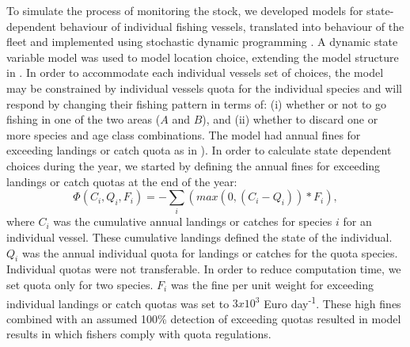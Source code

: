 \documentclass[12pt,oneline,a4paper,numbib]{ouparticle}
\numberwithin{equation}{subsection} %
\begin{document}
To simulate the process of monitoring the stock, we developed models for state-dependent behaviour of individual fishing vessels, translated into behaviour of the fleet and implemented using stochastic dynamic programming \cite{Alzorriz2018, Batsleer2015, ClarkandMangel2000, Dowling2011, Houston1999, Poos2010}. A dynamic state variable model \cite{ClarkandMangel2000, Houston1999} was used to model location choice, extending the model structure in \cite{Batsleer2015}. In order to accommodate each individual vessels set of choices, the model may be constrained by individual vessels quota for the individual species and will respond by changing their fishing pattern in terms of: (i) whether or not to go fishing in one of the two areas ($A$ and $B$), and (ii) whether to discard one or more species and age class combinations. The model had annual fines for exceeding landings or catch quota as in \cite{Alzorriz2018}). In order to calculate state dependent choices during the year, we started by defining the annual fines for exceeding landings or catch quotas at the end of the year:
\begin{equation}
\Phi (C_i, Q_i, F_i)= -\sum_i (max( 0, (C_i - Q_i))* F_i),
\end{equation}
where $C_i$ was the cumulative annual landings or catches for species $i$ for an individual vessel. These cumulative landings defined the state of the individual. $Q_i$ was the annual individual quota for landings or catches for the quota species. Individual quotas were not transferable. In order to reduce computation time, we set quota only for two species. $F_i$ was the fine per unit weight for exceeding individual landings or catch quotas was set to $3 x 10^3$ Euro day\textsuperscript{-1}. These high fines combined with an assumed 100\% detection of exceeding quotas resulted in model results in which fishers comply with quota regulations.
\end{document}
